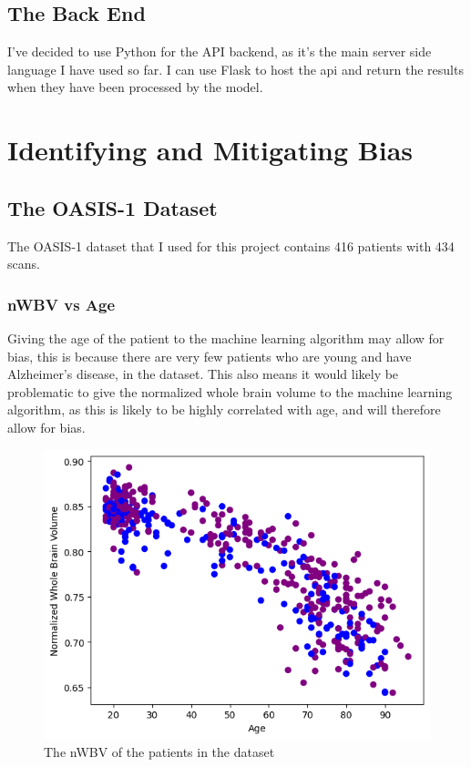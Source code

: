 \documentclass[]{final_report}
\begin{document}
\section{The Back End}

I've decided to use Python for the API backend, as it's the main server side language I have used so far. I can use Flask to host the api and return the results when they have been processed by the model.

\chapter{Identifying and Mitigating Bias}


\section{The OASIS-1 Dataset}
The OASIS-1 dataset\cite{OASIS} that I used for this project contains 416 patients with 434 scans.

\subsection{nWBV vs Age}
Giving the age of the patient to the machine learning algorithm may allow for bias, this is because there are very few patients who are young and have Alzheimer's disease, in the dataset.
This also means it would likely be problematic to give the normalized whole brain volume to the machine learning algorithm, as this is likely to be highly correlated with age, and will therefore allow for bias.

\begin{figure}[h]
  \centering
  \includegraphics[width=1\textwidth]{images/nWBV-vs-Age.png}
  \caption{The nWBV of the patients in the dataset}
  \label{fig:nWBV-vs-Age}
\end{figure}
\end{document}
